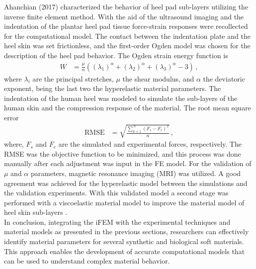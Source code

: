 Ahanchian (2017) characterized the behavior of heel pad sub-layers utilizing the inverse finite element method.
With the aid of the ultrasound imaging and the indentation of the plantar heel pad tissue force-strain responses were recollected 
for the computational model. The contact between the indentation plate and the heel skin was set frictionless, and the first-order 
Ogden model was chosen for the description of the heel pad behavior. The Ogden strain energy function is
\begin{align}
        W &= \frac{\mu}{\alpha}((\lambda_1)^{\alpha} + (\lambda_2)^{\alpha} + (\lambda_3)^{\alpha} - 3) \,,
\end{align}
where $\lambda_i$ are the principal stretches, $\mu$ the shear modulus, and $\alpha$ the deviatoric exponent, being the last two
the hyperelastic material parameters. 
The indentation of the human heel was modeled to simulate the sub-layers of the human skin and the compression response of the material.
The root mean square error 
\begin{align}
        \text{RMSE} &= \sqrt{\frac{\sum_{k=1}^N (F_s - F_e)^2}{n} }\,,
\end{align}
where, $F_s$ and $F_e$ are the simulated and experimental forces, respectively. The RMSE was the objective function to be minimized, 
and this process was done manually after each adjustment was input in the FE model. 
For the validation of  $\mu$ and $\alpha$ parameters, magnetic resonance imaging (MRI) was utilized.
A good agreement was achieved for the hyperelastic model between the simulations and the validation experiments. With this validated model 
a second stage was performed with a viscoelastic material model to improve the material model of heel skin sub-layers \cite{Ahanchian2017}.\\

In conclusion, integrating the iFEM with the experimental techniques and material models as presented in the previous sections, 
researchers can effectively identify material parameters for several synthetic and biological soft materials. 
This approach enables the development of accurate computational models that can be used to understand complex material behavior. 

